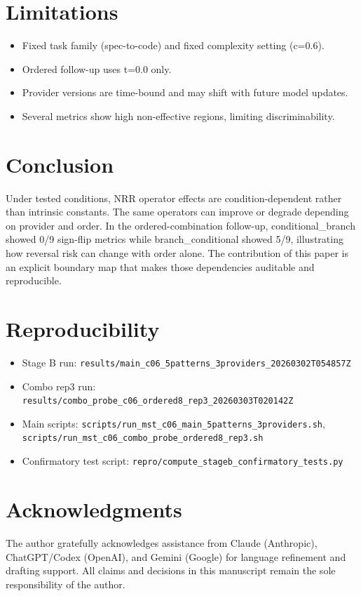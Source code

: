 \documentclass[11pt,a4paper]{article}
\begin{document}
\section{Limitations}
\label{sec:limitations}

\begin{itemize}
  \item Fixed task family (spec-to-code) and fixed complexity setting (c=0.6).
  \item Ordered follow-up uses t=0.0 only.
  \item Provider versions are time-bound and may shift with future model updates.
  \item Several metrics show high non-effective regions, limiting discriminability.
\end{itemize}

\section{Conclusion}
\label{sec:conclusion}

Under tested conditions, NRR operator effects are condition-dependent rather than intrinsic constants. The same operators can improve or degrade depending on provider and order. In the ordered-combination follow-up, conditional\_branch showed 0/9 sign-flip metrics while branch\_conditional showed 5/9, illustrating how reversal risk can change with order alone. The contribution of this paper is an explicit boundary map that makes those dependencies auditable and reproducible.

\section{Reproducibility}
\label{sec:repro}

\begin{itemize}
  \item Stage B run: \texttt{results/main\_c06\_5patterns\_3providers\_20260302T054857Z}
  \item Combo rep3 run: \texttt{results/combo\_probe\_c06\_ordered8\_rep3\_20260303T020142Z}
  \item Main scripts: \texttt{scripts/run\_mst\_c06\_main\_5patterns\_3providers.sh}, \texttt{scripts/run\_mst\_c06\_combo\_probe\_ordered8\_rep3.sh}
  \item Confirmatory test script: \texttt{repro/compute\_stageb\_confirmatory\_tests.py}
\end{itemize}

\section*{Acknowledgments}
The author gratefully acknowledges assistance from Claude (Anthropic), ChatGPT/Codex (OpenAI), and Gemini (Google) for language refinement and drafting support. All claims and decisions in this manuscript remain the sole responsibility of the author.
\end{document}
